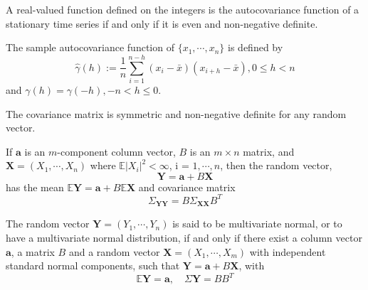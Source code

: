 \begin{theorem}
      A real-valued
function defined on the integers is the autocovariance function of a
stationary time series if and only if it is even and non-negative definite. 
\end{theorem}

\begin{definition}
     The sample autocovariance function of $\{x_ 1 , \cdots , x_n\}$ is defined by
    \[
    \hat{\gamma}(h) := \dfrac{1}{n}\sum\limits_{i=1}^{n-h}(x_i-\bar{x})(x_{i+h}-\bar{x}), 0\leq h <n
    \] 
and $\gamma(h) = \gamma( -h), -n < h \leq 0$.
\end{definition}

\begin{proposition}
    The covariance matrix is symmetric and non-negative definite for any random vector.
\end{proposition}

\begin{proposition}
    If $\textbf{a}$ is an $m$-component column vector, $B$ is an $m \times n$ matrix, and $\textbf{X} =(X_1 , \cdots , X_n)$ where $\mathbb{E}|X_i|^2 < \infty$, i = $1, \cdots , n$, then the random vector,
    \[
    \textbf{Y} = \textbf{a} + B\textbf{X}
    \]
    has the mean $\mathbb{E}\textbf{Y} = \textbf{a} + B\mathbb{E}\textbf{X}$ and covariance matrix
    \[
    \Sigma_{\textbf{Y}\textbf{Y}} = B\Sigma_{\textbf{X}\textbf{X}}B^T
    \]
\end{proposition}

\begin{definition}   The random vector
$\textbf{Y} = ( Y_1 , \cdots , Y_n)$ is said to be multivariate normal, or to have a multivariate normal distribution, if and only if there exist a column vector $\textbf{a}$, a matrix $B$
and a random vector $\textbf{X}= (X_1 ,\cdots,X_m)$ with independent standard normal components, such that $\textbf{Y} = \textbf{a}+B\textbf{X}$, with
\[
\mathbb{E}\textbf{Y} = \textbf{a},\quad \Sigma\textbf{Y} = BB^T 
\]
\end{definition}


